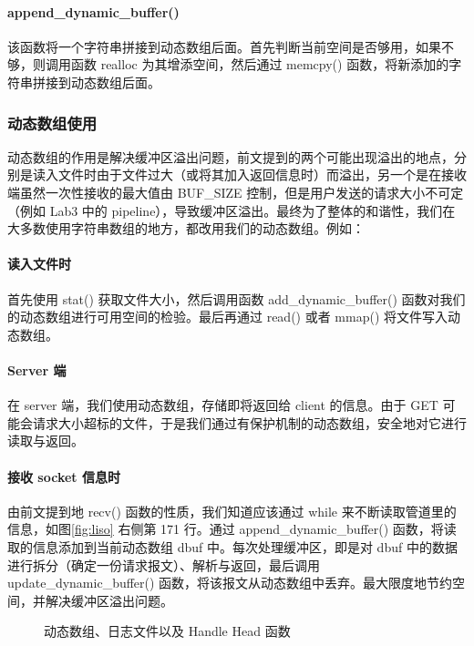 \paragraph*{append\_dynamic\_buffer()} 该函数将一个字符串拼接到动态数组后面。首先判断当前空间是否够用，如果不够，则调用函数 realloc 为其增添空间，然后通过 memcpy() 函数，将新添加的字符串拼接到动态数组后面。


\subsubsection{动态数组使用}

动态数组的作用是解决缓冲区溢出问题，前文提到的两个可能出现溢出的地点，分别是读入文件时由于文件过大（或将其加入返回信息时）而溢出，另一个是在接收端虽然一次性接收的最大值由 BUF\_SIZE 控制，但是用户发送的请求大小不可定（例如 Lab3 中的 pipeline），导致缓冲区溢出。最终为了整体的和谐性，我们在大多数使用字符串数组的地方，都改用我们的动态数组。例如：

\paragraph*{读入文件时} 首先使用 stat() 获取文件大小，然后调用函数 add\_dynamic\_buffer() 函数对我们的动态数组进行可用空间的检验。最后再通过 read() 或者 mmap() 将文件写入动态数组。

\paragraph*{Server 端} 在 server 端，我们使用动态数组，存储即将返回给 client 的信息。由于 GET 可能会请求大小超标的文件，于是我们通过有保护机制的动态数组，安全地对它进行读取与返回。

\paragraph*{接收 socket 信息时} 由前文提到地 recv() 函数的性质，我们知道应该通过 while 来不断读取管道里的信息，如图\ref{fig:liso} 右侧第 171 行。通过 append\_dynamic\_buffer() 函数，将读取的信息添加到当前动态数组 dbuf 中。每次处理缓冲区，即是对 dbuf 中的数据进行拆分（确定一份请求报文）、解析与返回，最后调用 update\_dynamic\_buffer() 函数，将该报文从动态数组中丢弃。最大限度地节约空间，并解决缓冲区溢出问题。
\begin{figure}[htbp!]
    \centering
    \caption{动态数组、日志文件以及 Handle Head 函数}\label{fig:Chapter2}
\end{figure}


